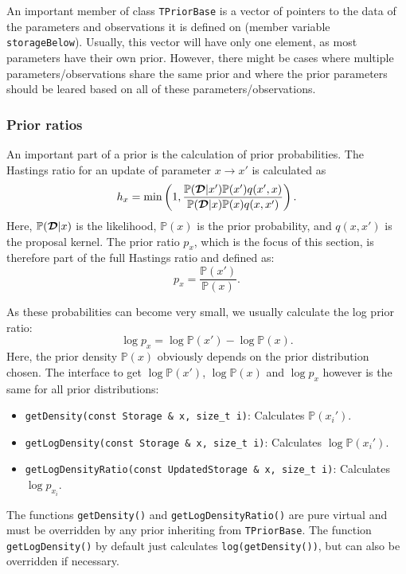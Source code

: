 \documentclass[a4paper,11pt]{article}
\def\bD{\boldsymbol{{\cal D}}}
\def\p{\mathbb{P}}
\newcommand{\class}[1]{\texttt{#1}}
\newcommand{\privparam}[1]{\texttt{\textunderscore #1}}
\newcommand{\pubfunc}[1]{\texttt{#1()}}
\begin{document}
An important member of class \class{TPriorBase} is a vector of pointers to the data of the parameters and observations it is defined on (member variable \privparam{storageBelow}). Usually, this vector will have only one element, as most parameters have their own prior. However, there might be cases where multiple parameters/observations share the same prior and where the prior parameters should be leared based on all of these parameters/observations.

\subsubsection{Prior ratios}
An important part of a prior is the calculation of prior probabilities. The Hastings ratio for an update of parameter $x \to x'$ is calculated as
\begin{equation*}
 h_x = \min \left(1, \frac{\p(\bD|x') \p(x') q(x', x)}{\p(\bD|x) \p(x) q(x, x')}\right).
\end{equation*}
Here, $\p(\bD|x)$ is the likelihood, $\p(x)$ is the prior probability, and $q(x, x')$ is the proposal kernel. The prior ratio $p_x$, which is the focus of this section, is therefore part of the full Hastings ratio and defined as:
\begin{equation*}
 p_x = \frac{\p(x')}{\p(x)}.
\end{equation*}

As these probabilities can become very small, we usually calculate the log prior ratio:
\begin{equation*}
\log p_x = \log \p(x') - \log \p(x).
\end{equation*}
Here, the prior density $\p(x)$ obviously depends on the prior distribution chosen. The interface to get $\log \p(x')$, $\log \p(x)$ and $\log p_x$ however is the same for all prior distributions:
\begin{itemize}
\item \texttt{getDensity(const Storage \& x, size\_t i)}: Calculates $\p(x_i')$.
\item \texttt{getLogDensity(const Storage \& x, size\_t i)}: Calculates $\log \p(x_i')$.
\item \texttt{getLogDensityRatio(const UpdatedStorage \& x, size\_t i)}: Calculates $\log p_{x_{i}}$.
\end{itemize}

The functions \pubfunc{getDensity} and \pubfunc{getLogDensityRatio} are pure virtual and must be overridden by any prior inheriting from \class{TPriorBase}. The function \pubfunc{getLogDensity} by default just calculates \texttt{log(getDensity())}, but can also be overridden if necessary.
\end{document}
